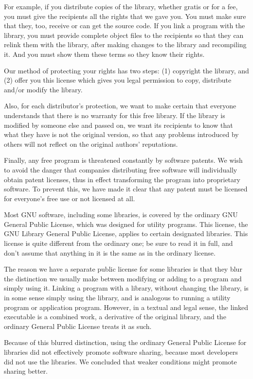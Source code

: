 For example, if you distribute copies of the library, whether gratis or for a fee, you must give the recipients all the rights that we gave you. You must make sure that they, too, receive or can get the source code. If you link a program with the library, you must provide complete object files to the recipients so that they can relink them with the library, after making changes to the library and recompiling it. And you must show them these terms so they know their rights. 

Our method of protecting your rights has two steps: (1) copyright the library, and (2) offer you this license which gives you legal permission to copy, distribute and/or modify the library. 

Also, for each distributor's protection, we want to make certain that everyone understands that there is no warranty for this free library. If the library is modified by someone else and passed on, we want its recipients to know that what they have is not the original version, so that any problems introduced by others will not reflect on the original authors' reputations. 

Finally, any free program is threatened constantly by software patents. We wish to avoid the danger that companies distributing free software will individually obtain patent licenses, thus in effect transforming the program into proprietary software. To prevent this, we have made it clear that any patent must be licensed for everyone's free use or not licensed at all. 

Most GNU software, including some libraries, is covered by the ordinary GNU General Public License, which was designed for utility programs. This license, the GNU Library General Public License, applies to certain designated libraries. This license is quite different from the ordinary one; be sure to read it in full, and don't assume that anything in it is the same as in the ordinary license. 

The reason we have a separate public license for some libraries is that they blur the distinction we usually make between modifying or adding to a program and simply using it. Linking a program with a library, without changing the library, is in some sense simply using the library, and is analogous to running a utility program or application program. However, in a textual and legal sense, the linked executable is a combined work, a derivative of the original library, and the ordinary General Public License treats it as such. 

Because of this blurred distinction, using the ordinary General Public License for libraries did not effectively promote software sharing, because most developers did not use the libraries. We concluded that weaker conditions might promote sharing better. 

